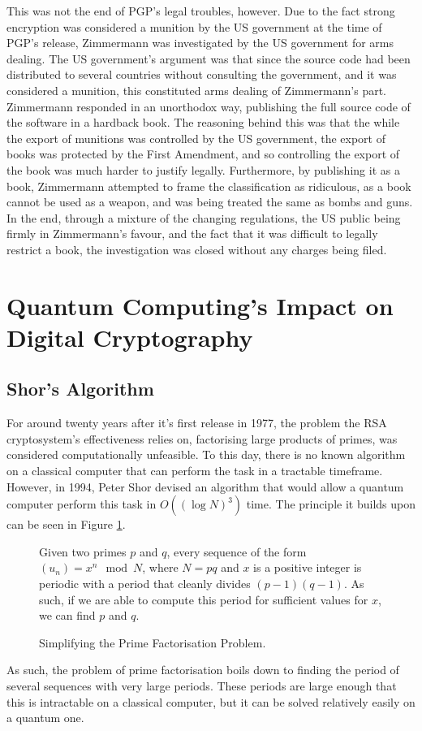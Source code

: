 \documentclass[a4paper,12pt]{report}
\begin{document}
This was not the end of PGP's legal troubles, however. Due to the fact strong
encryption was considered a munition by the US government at the time of PGP's
release, Zimmermann was investigated by the US government for arms
dealing\cite{dubois}. The US government's argument was that since the source
code had been distributed to several countries without consulting the
government, and it was considered a munition, this constituted arms dealing of
Zimmermann's part. Zimmermann responded in an unorthodox way, publishing the
full source code of the software in a hardback book. The reasoning behind this
was that the while the export of munitions was controlled by the US government,
the export of books was protected by the First Amendment, and so controlling
the export of the book was much harder to justify legally. Furthermore, by
publishing it as a book, Zimmermann attempted to frame the classification as
ridiculous, as a book cannot be used as a weapon, and was being treated the same
as bombs and guns. In the end, through a mixture of the changing regulations,
the US public being firmly in Zimmermann's favour, and the fact that it was
difficult to legally restrict a book, the investigation was closed without any
charges being filed.

  \section{Quantum Computing's Impact on Digital Cryptography}
    \subsection{Shor's Algorithm}
For around twenty years after it's first release in 1977, the problem the RSA
cryptosystem's effectiveness relies on, factorising large products of primes,
was considered computationally unfeasible. To this day, there is no known
algorithm on a classical computer that can perform the task in a tractable
timeframe. However, in 1994, Peter Shor devised an algorithm that would allow a
quantum computer perform this task in \(O((\log N)^3)\) time. The principle it
builds upon can be seen in Figure \ref{fig:beforeshors}.
    \begin{figure}[h!]
    \begin{center}
Given two primes \(p\) and \(q\), every sequence of the form
\((u_n) = x^n \mod N\), where \(N = pq\) and \(x\) is a positive integer is
periodic with a period that cleanly divides \((p-1)(q-1)\). As such, if we are
able to compute this period for sufficient values for \(x\), we can find \(p\)
and \(q\).
    \end{center}
      \caption{Simplifying the Prime Factorisation Problem.}
      \label{fig:beforeshors}
    \end{figure}
As such, the problem of prime factorisation boils down to finding the period of
several sequences with very large periods. These periods are large enough that
this is intractable on a classical computer, but it can be solved relatively
easily on a quantum one.
\end{document}
